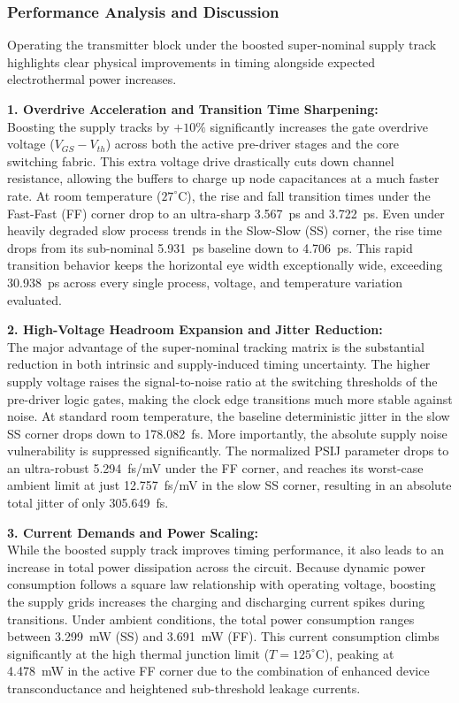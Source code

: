 \clearpage

\subsubsection*{Performance Analysis and Discussion}

Operating the transmitter block under the boosted super-nominal supply track highlights clear physical improvements in timing alongside expected electrothermal power increases.

\textbf{1. Overdrive Acceleration and Transition Time Sharpening:} \\
Boosting the supply tracks by $+10\%$ significantly increases the gate overdrive voltage ($V_{GS} - V_{th}$) across both the active pre-driver stages and the core switching fabric. This extra voltage drive drastically cuts down channel resistance, allowing the buffers to charge up node capacitances at a much faster rate. At room temperature ($27^{\circ}\text{C}$), the rise and fall transition times under the Fast-Fast (FF) corner drop to an ultra-sharp 3.567~ps and 3.722~ps. Even under heavily degraded slow process trends in the Slow-Slow (SS) corner, the rise time drops from its sub-nominal 5.931~ps baseline down to 4.706~ps. This rapid transition behavior keeps the horizontal eye width exceptionally wide, exceeding 30.938~ps across every single process, voltage, and temperature variation evaluated.

\textbf{2. High-Voltage Headroom Expansion and Jitter Reduction:} \\
The major advantage of the super-nominal tracking matrix is the substantial reduction in both intrinsic and supply-induced timing uncertainty. The higher supply voltage raises the signal-to-noise ratio at the switching thresholds of the pre-driver logic gates, making the clock edge transitions much more stable against noise. At standard room temperature, the baseline deterministic jitter in the slow SS corner drops down to 178.082~fs. More importantly, the absolute supply noise vulnerability is suppressed significantly. The normalized PSIJ parameter drops to an ultra-robust 5.294~fs/mV under the FF corner, and reaches its worst-case ambient limit at just 12.757~fs/mV in the slow SS corner, resulting in an absolute total jitter of only 305.649~fs.

\textbf{3. Current Demands and Power Scaling:} \\
While the boosted supply track improves timing performance, it also leads to an increase in total power dissipation across the circuit. Because dynamic power consumption follows a square law relationship with operating voltage, boosting the supply grids increases the charging and discharging current spikes during transitions. Under ambient conditions, the total power consumption ranges between 3.299~mW (SS) and 3.691~mW (FF). This current consumption climbs significantly at the high thermal junction limit ($T = 125^{\circ}\text{C}$), peaking at 4.478~mW in the active FF corner due to the combination of enhanced device transconductance and heightened sub-threshold leakage currents.

